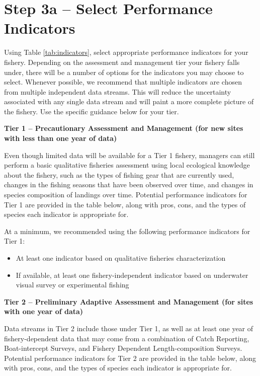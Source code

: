 \documentclass[]{book}
\begin{document}
\hypertarget{Step3a}{\section{Step 3a -- Select Performance
Indicators}\label{Step3a}}

Using Table \ref{tab:indicators}, select appropriate performance
indicators for your fishery. Depending on the assessment and management
tier your fishery falls under, there will be a number of options for the
indicators you may choose to select. Whenever possible, we recommend
that multiple indicators are chosen from multiple independent data
streams. This will reduce the uncertainty associated with any single
data stream and will paint a more complete picture of the fishery. Use
the specific guidance below for your tier.

\textbf{Tier 1 -- Precautionary Assessment and Management (for new sites
with less than one year of data)}

Even though limited data will be available for a Tier 1 fishery,
managers can still perform a basic qualitative fisheries assessment
using local ecological knowledge about the fishery, such as the types of
fishing gear that are currently used, changes in the fishing seasons
that have been observed over time, and changes in species composition of
landings over time. Potential performance indicators for Tier 1 are
provided in the table below, along with pros, cons, and the types of
species each indicator is appropriate for.

At a minimum, we recommended using the following performance indicators
for Tier 1:

\begin{itemize}
\item
  At least one indicator based on qualitative fisheries characterization
\item
  If available, at least one fishery-independent indicator based on
  underwater visual survey or experimental fishing
\end{itemize}

\textbf{Tier 2 -- Preliminary Adaptive Assessment and Management (for
sites with one year of data)}

Data streams in Tier 2 include those under Tier 1, as well as at least
one year of fishery-dependent data that may come from a combination of
Catch Reporting, Boat-intercept Surveys, and Fishery Dependent
Length-composition Surveys. Potential performance indicators for Tier 2
are provided in the table below, along with pros, cons, and the types of
species each indicator is appropriate for.
\end{document}
